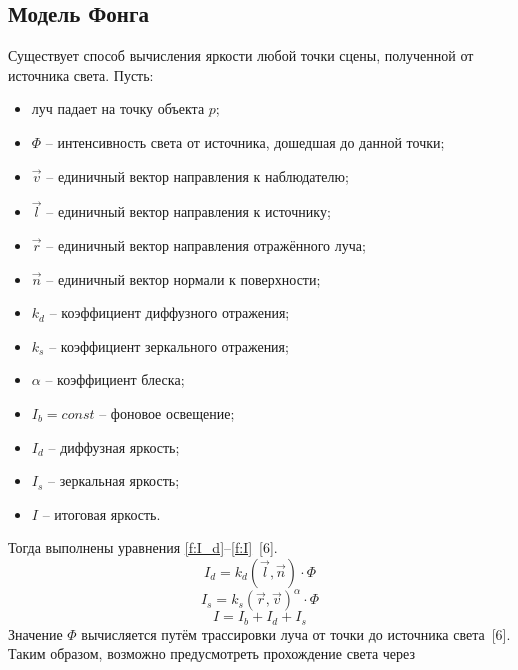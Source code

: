 {    \subsection {Модель Фонга} {
        Существует способ вычисления яркости любой точки сцены,
        полученной от источника света.
        Пусть:
        \begin{itemize}
            \item луч падает на точку объекта $p$;
            \item
                $\Phi$ -- интенсивность света от источника,
                дошедшая до данной точки;
            \item $\vec{v}$ -- единичный вектор направления к наблюдателю;
            \item $\vec{l}$ -- единичный вектор направления к источнику;
            \item $\vec{r}$ -- единичный вектор направления отражённого луча;
            \item $\vec{n}$ -- единичный вектор нормали к поверхности;
            \item $k_d$ -- коэффициент диффузного отражения;
            \item $k_s$ -- коэффициент зеркального отражения;
            \item $\alpha$ -- коэффициент блеска;
            \item $I_b = const$ -- фоновое освещение;
            \item $I_d$ -- диффузная яркость;
            \item $I_s$ -- зеркальная яркость;
            \item $I$ -- итоговая яркость.
        \end{itemize}
        Тогда выполнены уравнения \ref{f:I_d}--\ref{f:I}~[6].
        \begin{equation}
            \label{f:I_d}
            I_d = k_d(\vec{l}, \vec{n}) \cdot \Phi
        \end{equation}
        \begin{equation}
            \label{f:I_s}
            I_s = k_s(\vec{r}, \vec{v})^{\alpha} \cdot \Phi
        \end{equation}
        \begin{equation}
            \label{f:I}
            I = I_b + I_d + I_s
        \end{equation}
        Значение $\Phi$ вычисляется путём трассировки луча
        от точки до источника света~[6].
        Таким образом, возможно предусмотреть прохождение света через
}}
